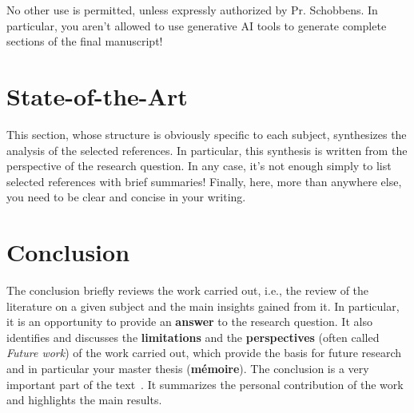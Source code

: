 No other use is permitted, unless expressly authorized by Pr. Schobbens. In particular, you aren't allowed to use generative AI tools to generate complete sections of the final manuscript!

\section{State-of-the-Art}

This section, whose structure is obviously specific to each subject, synthesizes the analysis of the selected references. In particular, this synthesis is written from the perspective of the research question. In any case, it's not enough simply to list selected references with brief summaries!
Finally, here, more than anywhere else, you need to be clear and concise in your writing.

\section{Conclusion}

The conclusion briefly reviews the work carried out, i.e., the review of the literature on a given subject and the main insights gained from it. In particular, it is an opportunity to provide an \textbf{answer} to the research question. It also identifies and discusses the \textbf{limitations} and the \textbf{perspectives} (often called \textit{Future work}) of the work carried out, which provide the basis for future research and in particular your master thesis (\textbf{mémoire}).
The conclusion is a very important part of the text~\cite{melot2008elements}. It summarizes the personal contribution of the work and highlights the main results.
